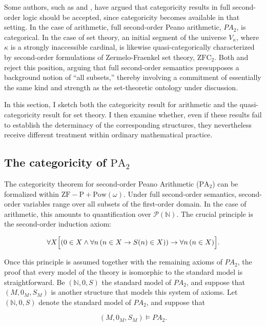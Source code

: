 \documentclass[11pt,a4paper]{article}
\theoremstyle{plain}
\begin{document}
Some authors, such as \textcite[31]{Isaacson2008} and \textcite[chapter 8]{shapiro1991foundations}, have argued that categoricity results in full second-order logic should be accepted, since categoricity becomes available in that setting. In the case of arithmetic, full second-order Peano arithmetic, $PA_2$, is categorical. In the case of set theory, an initial segment of the universe $V_\kappa$, where $\kappa$ is a strongly inaccessible cardinal, is likewise quasi-categorically characterized by second-order formulations of Zermelo-Fraenkel set theory, $\mathrm{ZFC}_2$. Both \textcite[19]{Feferman2011a} and \textcite[511]{Koellner2016} reject this position, arguing that full second-order semantics presupposes a background notion of ``all subsets,'' thereby involving a commitment of essentially the same kind and strength as the set-theoretic ontology under discussion. 

In this section, I sketch both the categoricity result for arithmetic and the quasi-categoricity result for set theory. I then examine whether, even if these results fail to establish the determinacy of the corresponding structures, they nevertheless receive different treatment within ordinary mathematical practice.

\subsection{The categoricity of \texorpdfstring{$\mathrm{PA}_2$}{PA2}}

The categoricity theorem for second-order Peano Arithmetic ($\mathrm{PA}_2$) can be formalized within $\mathrm{ZF\!-\!P}+\mathrm{Pow}(\omega)$. Under full second-order semantics, second-order variables range over all subsets of the first-order domain. In the case of arithmetic, this amounts to quantification over $\mathcal{P}(\mathbb{N})$. The crucial principle is the second-order induction axiom:

\[
\forall X\Bigl[(0\in X \wedge \forall n\,(n\in X \rightarrow S(n)\in X))
\rightarrow \forall n\,(n\in X)\Bigr].
\]

Once this principle is assumed together with the remaining axioms of $PA_2$, the proof that every model of the theory is isomorphic to the standard model is straightforward.  Be $(\mathbb{N},0,S)$ the standard model of $PA_2$, and suppose that $(M,0_M, S_M)$ is another structure that models this system of axioms. Let $(\mathbb{N},0,S)$ denote the standard model of $PA_2$, and suppose that

\[
(M,0_M,S_M)\models PA_2.
\]
\end{document}
